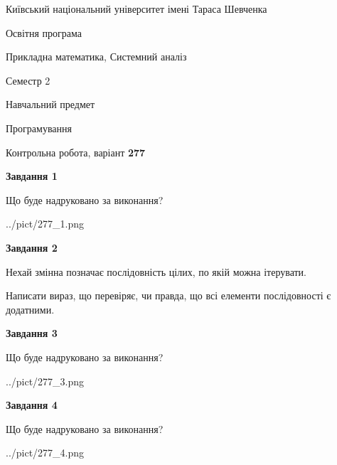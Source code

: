 \documentclass[12pt, ukrainian]{article}
\begin{document}
{{\begin {small}\par
{ \center  Київський національний університет імені Тараса Шевченка \par}
{\parbox {5 cm}{Освітня програма \hfill}{\parbox {8 cm}{Прикладна математика, Системний аналіз \hfill}}\parbox {5 cm}{\hfill Семестр 2}}\par
{\parbox {5 cm} {Навчальний предмет \hfill}\parbox {7 cm}{Програмування \hfill}\parbox {6cm}{\hfill}\par}\vspace{-7pt} \end{small}}{\center Контрольна робота, варіант  \No \textbf
{ 277 }\par}}
{
\begin {large}
{\begin {center}\textbf{Завдання 1}\end {center}}\par
Що буде надруковано за виконання?\par\par
\begin{center}
	{../pict/277_1.png}
\end{center}
\newpage

{\begin {center}\textbf{Завдання 2}\end {center}}\par
Нехай змінна  позначає послідовність цілих, по якій можна ітерувати.

Написати вираз, що перевіряє, чи правда, що всі елементи послідовності є додатни\-ми.\par
\newpage

{\begin {center}\textbf{Завдання 3}\end {center}}\par
Що буде надруковано за виконання?
\begin{center}
	{../pict/277_3.png}
\end{center}
\newpage

{\begin {center}\textbf{Завдання 4}\end {center}}\par
Що буде надруковано за виконання?\par
\begin{center}
	{../pict/277_4.png}
\end{center}
\newpage


\end{large}}
\end{document}
